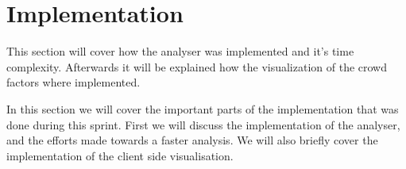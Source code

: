 \section{Implementation}
This section will cover how the analyser was implemented and it's time complexity. Afterwards it will be explained how the visualization of the crowd factors where implemented.

In this section we will cover the important parts of the implementation that was done during this sprint. First we will discuss the implementation of the analyser, and the efforts made towards a faster analysis. We will also briefly cover the implementation of the client side visualisation.



